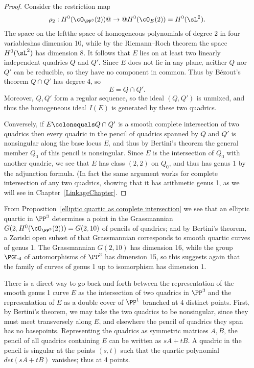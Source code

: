 \begin{proof}
Consider the restriction map
$$
\rho_2  : H^0(\cO_{\PP^3}(2)) @ \to @ H^0(\cO_{E}(2)) = H^0(\sL^2).
$$
The space on the left\emdash the space of homogeneous polynomials of
degree 2 in four variables\emdash has dimension 10, while by the
Riemann--Roch theorem
%
the space $H^0(\sL^2)$ has dimension 8. It follows that $E$ lies on at least two linearly independent quadrics $Q$ and $Q'$. Since $E$ does not lie in any plane, neither $Q$ nor $Q'$ can be reducible, so they have no component in common.
Thus by
B\'ezout's theorem
%
$Q \cap Q' $ has degree 4, so
$$
E =Q \cap Q'.
$$
%
Moreover, $Q,Q'$ form a regular sequence, so the ideal $(Q,Q')$ is unmixed, and thus the homogeneous ideal $I(E)$ is generated by
these two quadrics.

Conversely, if $E \colonequals Q\cap Q'$ is a smooth complete intersection of
two quadrics then  every quadric in the
pencil of quadrics
%
spanned by $Q$ and $Q'$ is nonsingular along the base locus $E$, and
thus by
Bertini's theorem
%
the general member $Q_0$ of this
pencil is nonsingular. Since $E$ is the intersection of $Q_0$ with another quadric, we see that $E$ has class $(2,2)$ on $Q_0$,
and thus has genus 1 by the adjunction formula. (In fact the same argument works for complete intersection of any two quadrics,
showing that it has arithmetic genus 1, as we will see in Chapter~\ref{LinkageChapter}.
\end{proof}

From Proposition~\ref{elliptic quartic as complete intersection}
we see that an
elliptic quartic
%
in $\PP^3$
determines a point in the Grassmannian
%
$G(2, H^0(\cO_{\PP^3}(2))) =
G(2, 10)$ of pencils of quadrics; and by Bertini's theorem, a Zariski
open subset of that Grassmannian corresponds to smooth quartic curves
of genus 1. The Grassmannian $G(2,10)$ has dimension 16, while the
group $\PGL_4$ of automorphisms of $\PP^3$ has dimension 15, so this
suggests again that the family of curves of genus 1 up to isomorphism
has dimension 1.

There is a direct way to go back and forth between the representation of the smooth genus 1 curve $E$ as the intersection of two quadrics in $\PP^3$ and the representation of $E$ as a double cover
of $\PP^1$ branched at 4 distinct points. First, by
Bertini's theorem,
%
we may take the two quadrics to be nonsingular, since they must meet
transversely along $E$, and elsewhere the
pencil of quadrics they span has no basepoints. Representing the quadrics as symmetric matrices $A,B$, the pencil of all quadrics containing $E$ can be
written as $sA+tB$. A quadric in the pencil is singular at the points $(s,t)$ such that the quartic polynomial $det(sA+tB)$ vanishes; thus at 4 points.

